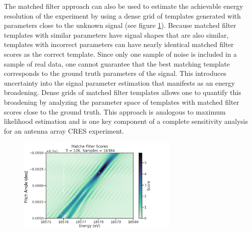 The matched filter approach can also be used to estimate the achievable energy resolution of the experiment by using a dense grid of templates generated with parameters close to the unknown signal (see figure \ref{fig:chap4-mf-score-dense-grid}). Because matched filter templates with similar parameters have signal shapes that are also similar, templates with incorrect parameters can have nearly identical matched filter scores as the correct template. Since only one sample of noise is included in a sample of real data, one cannot guarantee that the best matching template corresponds to the ground truth parameters of the signal. This introduces uncertainty into the signal parameter estimation that manifests as an energy broadening. Dense grids of matched filter templates allows one to quantify this broadening by analyzing the parameter space of templates with matched filter scores close to the ground truth. This approach is analogous to maximum likelihood estimation and is one key component of a complete sensitivity analysis for an antenna array CRES experiment.

\begin{figure}[htbp]
    \centering
    \includegraphics*[width=0.7\textwidth]{figs/Chapter-4/230725_example_mf_score_map.png}
    \caption{\label{fig:chap4-mf-score-dense-grid}}
\end{figure}

